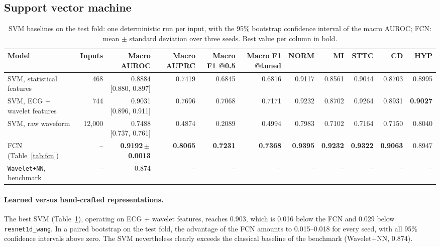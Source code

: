 \documentclass{article}
\newcommand{\wang}{\texttt{resnet1d\_wang}}
\begin{document}
\subsection{Support vector machine}

\begin{table}[htb]
  \caption{SVM baselines on the test fold: one deterministic run per input, with the 95\% bootstrap confidence interval of the macro AUROC; FCN: mean $\pm$ standard deviation over three seeds. Best value per column in bold.}
  \label{tab:svm}
  \centering\footnotesize
  \begin{adjustbox}{max width=\linewidth}
  \begin{tabular}{lrrrrrrrrrr}
    \toprule
    Model & Inputs & Macro AUROC & Macro AUPRC & Macro F1 @0.5 & Macro F1 @tuned & NORM & MI & STTC & CD & HYP \\
    \midrule
    SVM, statistical features & 468 & 0.8884 [0.880, 0.897] & 0.7419 & 0.6845 & 0.6816 & 0.9117 & 0.8561 & 0.9044 & 0.8703 & 0.8995 \\
    SVM, ECG + wavelet features & 744 & 0.9031 [0.896, 0.911] & 0.7696 & 0.7068 & 0.7171 & 0.9232 & 0.8702 & 0.9264 & 0.8931 & \textbf{0.9027} \\
    SVM, raw waveform & 12,000 & 0.7488 [0.737, 0.761] & 0.4874 & 0.2089 & 0.4994 & 0.7983 & 0.7102 & 0.7164 & 0.7150 & 0.8040 \\
    FCN (Table~\ref{tab:fcn}) & -- & \textbf{0.9192\,$\pm$\,0.0013} & \textbf{0.8065} & \textbf{0.7231} & \textbf{0.7368} & \textbf{0.9395} & \textbf{0.9232} & \textbf{0.9322} & \textbf{0.9063} & 0.8947 \\
    \texttt{Wavelet+NN}, benchmark \citep{strodthoff2021} & -- & 0.874 & -- & -- & -- & -- & -- & -- & -- & -- \\
    \bottomrule
  \end{tabular}
  \end{adjustbox}
\end{table}


\paragraph{Learned versus hand-crafted representations.} The best SVM (Table~\ref{tab:svm}), operating on ECG + wavelet features, reaches 0.903, which is 0.016 below the FCN and 0.029 below \wang{}. In a paired bootstrap on the test fold, the advantage of the FCN amounts to 0.015--0.018 for every seed, with all 95\% confidence intervals above zero. The SVM nevertheless clearly exceeds the classical baseline of the benchmark (Wavelet+NN, 0.874).
\end{document}
